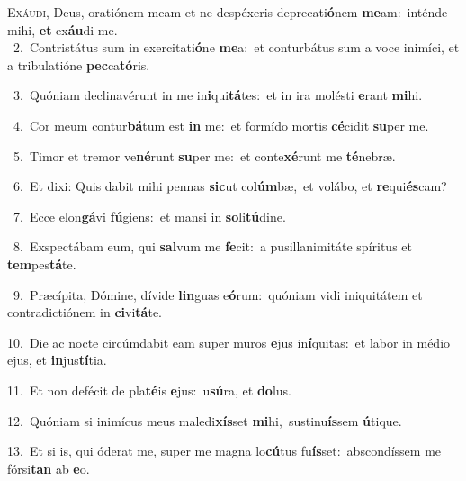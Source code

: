 \lettrine{\initial\textcolor{\initialcolor}{E}}{xáudi,} Deus, oratiónem meam et ne despéxeris deprecati\-\textbf{ó}\-nem \textbf{me}\-am:~\star inténde mihi, \textbf{et} ex\-\textbf{áu}\-di me.\\
{\numbfont\textcolor{\numbcolor}{~2.}}~Contristátus sum in exercitati\-\textbf{ó}\-ne \textbf{me}\-a:~\star et conturbátus sum a voce inimíci, et a tribulatióne \textbf{pec}\-ca\-\textbf{tó}\-ris.\par
{\numbfont\textcolor{\numbcolor}{~3.}}~Quóniam declinavérunt in me in\-\textbf{i}\-qui\-\textbf{tá}\-tes:~\star et in ira molésti \textbf{e}\-rant \textbf{mi}\-hi.\par
{\numbfont\textcolor{\numbcolor}{~4.}}~Cor meum contur\-\textbf{bá}\-tum est \textbf{in} me:~\star et formído mortis \textbf{cé}\-cidit \textbf{su}\-per me.\par
{\numbfont\textcolor{\numbcolor}{~5.}}~Timor et tremor ve\-\textbf{né}\-runt \textbf{su}\-per me:~\star et conte\-\textbf{xé}\-runt me \textbf{té}\-nebræ.\par
{\numbfont\textcolor{\numbcolor}{~6.}}~Et dixi: Quis dabit mihi pennas \textbf{sic}\-ut co\-\textbf{lúm}\-bæ,~\star et volábo, et \textbf{re}\-qui\-\textbf{és}\-cam?\par
{\numbfont\textcolor{\numbcolor}{~7.}}~Ecce elon\-\textbf{gá}\-vi \textbf{fú}\-giens:~\star et mansi in \textbf{so}\-li\-\textbf{tú}\-dine.\par
{\numbfont\textcolor{\numbcolor}{~8.}}~Exspectábam eum, qui \textbf{sal}\-vum me \textbf{fe}\-cit:~\star a pusillanimitáte spíritus et \textbf{tem}\-pes\-\textbf{tá}\-te.\par
{\numbfont\textcolor{\numbcolor}{~9.}}~Præcípita, Dómine, dívide \textbf{lin}\-guas e\-\textbf{ó}\-rum:~\star quóniam vidi iniquitátem et contradictiónem in \textbf{ci}\-vi\-\textbf{tá}\-te.\par
{\numbfont\textcolor{\numbcolor}{10.}}~Die ac nocte circúmdabit eam super muros \textbf{e}\-jus in\-\textbf{í}\-quitas:~\star et labor in médio ejus, et \textbf{in}\-jus\-\textbf{tí}\-tia.\par
{\numbfont\textcolor{\numbcolor}{11.}}~Et non defécit de pla\-\textbf{té}\-is \textbf{e}\-jus:~\star u\-\textbf{sú}\-ra, et \textbf{do}\-lus.\par
{\numbfont\textcolor{\numbcolor}{12.}}~Quóniam si inimícus meus maledi\-\textbf{xís}\-set \textbf{mi}\-hi,~\star sustinu\-\textbf{ís}\-sem \textbf{ú}\-tique.\par
{\numbfont\textcolor{\numbcolor}{13.}}~Et si is, qui óderat me, super me magna lo\-\textbf{cú}\-tus fu\-\textbf{ís}\-set:~\star abscondíssem me fórsi\textbf{tan} ab \textbf{e}\-o.\par
